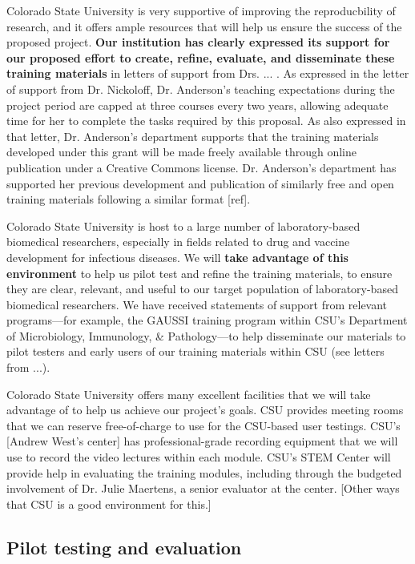\documentclass[pdftex,english,11pt,parskip=half]{scrartcl}
\begin{document}
Colorado State University is very supportive of improving the reproducbility of research, and it offers ample resources that will help us ensure the success of the proposed project. \textbf{Our institution has clearly expressed its support for our proposed effort to create, refine, evaluate, and disseminate these training materials} in letters of support from Drs. ... . As expressed in the letter of support from Dr. Nickoloff, Dr. Anderson's teaching expectations during the project period are capped at three courses every two years, allowing adequate time for her to complete the tasks required by this proposal. As also expressed in that letter, Dr. Anderson's department supports that the training materials developed under this grant will be made freely available through online publication under a Creative Commons license. Dr. Anderson's department has supported her previous development and publication of similarly free and open training materials following a similar format [ref].

Colorado State University is host to a large number of laboratory-based biomedical researchers, especially in fields related to drug and vaccine development for infectious diseases. We will \textbf{take advantage of this environment} to help us pilot test and refine the training materials, to ensure they are clear, relevant, and useful to our target population of laboratory-based biomedical researchers. We have received statements of support from relevant programs---for example, the GAUSSI training program within CSU's Department of Microbiology, Immunology, \& Pathology---to help disseminate our materials to pilot testers and early users of our training materials within CSU (see letters from ...). 

Colorado State University offers many excellent facilities that we will take advantage of to help us achieve our project's goals. CSU provides meeting rooms that we can reserve free-of-charge to use for the CSU-based user testings. CSU's [Andrew West's center] has professional-grade recording equipment that we will use to record the video lectures within each module. CSU's STEM Center will provide help in evaluating the training modules, including through the budgeted involvement of Dr. Julie Maertens, a senior evaluator at the center. [Other ways that CSU is a good environment for this.]

\subsection{Pilot testing and evaluation}
\end{document}

